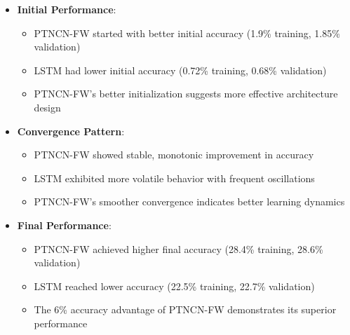 \documentclass{article}
\begin{document}
\begin{itemize}
    \item \textbf{Initial Performance}:
    \begin{itemize}
        \item PTNCN-FW started with better initial accuracy (1.9\% training, 1.85\% validation)
        \item LSTM had lower initial accuracy (0.72\% training, 0.68\% validation)
        \item PTNCN-FW's better initialization suggests more effective architecture design
    \end{itemize}

    \item \textbf{Convergence Pattern}:
    \begin{itemize}
        \item PTNCN-FW showed stable, monotonic improvement in accuracy
        \item LSTM exhibited more volatile behavior with frequent oscillations
        \item PTNCN-FW's smoother convergence indicates better learning dynamics
    \end{itemize}

    \item \textbf{Final Performance}:
    \begin{itemize}
        \item PTNCN-FW achieved higher final accuracy (28.4\% training, 28.6\% validation)
        \item LSTM reached lower accuracy (22.5\% training, 22.7\% validation)
        \item The 6\% accuracy advantage of PTNCN-FW demonstrates its superior performance
    \end{itemize}


\end{itemize}
\end{document}
